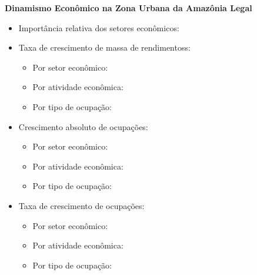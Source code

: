\documentclass[8pt]{beamer}
\begin{document}
\begin{frame}[label=indice_principal_amz_urbana]{}

\textit{\hyperlink{indice_principal}{}}

\textbf{Dinamismo Econômico na Zona Urbana da Amazônia Legal}
\vspace{2mm}

\begin{itemize}

\item{Importância relativa dos setores econômicos: \hyperlink{_amz_urbana_importancia_relativa}{}}
\vspace{1mm}

\item{Taxa de crescimento  de massa de rendimentoss:
	\begin{itemize}
	\item{Por setor econômico: \hyperlink{amzurbanarkngtxmassaporsetor}{}}
	\item{Por atividade econômica: \hyperlink{amzurbanarkngtxmassaporatividade}{}}
	\item{Por tipo de ocupação: \hyperlink{amzurbanarkngtxmassaporocupacao}{}}
	\end{itemize}
}
\vspace{1mm}

\item{Crescimento  absoluto de ocupações:
	\begin{itemize}
	\item{Por setor econômico: \hyperlink{amzurbanarkngnocuporsetor}{}}
	\item{Por atividade econômica: \hyperlink{amzurbanarkngnocuporatividade}{}}
	\item{Por tipo de ocupação: \hyperlink{amzurbanarkngnocuporocupacao}{}}
	\end{itemize}
}
\vspace{1mm}

\item{Taxa de crescimento de ocupações:
	\begin{itemize}
	\item{Por setor econômico: \hyperlink{amzurbanarkngtxocuporsetor}{}}
	\item{Por atividade econômica: \hyperlink{amzurbanarkngtxocuporatividade}{}}
	\item{Por tipo de ocupação: \hyperlink{amzurbanarkngtxocuporocupacao}{}}
	\end{itemize}
}
\vspace{1mm}


\end{itemize}
\end{frame}
\end{document}
